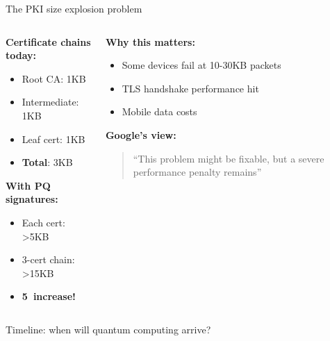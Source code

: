 \documentclass[aspectratio=169, lualatex, handout]{beamer}
\begin{document}
\begin{frame}{The PKI size explosion problem}
	\begin{columns}[c]
		\begin{column}{0.5\textwidth}
			\textbf{Certificate chains today:}
			\begin{itemize}
				\item Root CA: \approx1KB
				\item Intermediate: \approx1KB
				\item Leaf cert: \approx1KB
				\item \textbf{Total}: \approx3KB
			\end{itemize}
			\vspace{5mm}
			\textbf{With PQ signatures:}
			\begin{itemize}
				\item Each cert: >5KB
				\item 3-cert chain: >15KB
				\item \textbf{5\times\ increase!}
			\end{itemize}
		\end{column}
		\begin{column}{0.5\textwidth}
			\textbf{Why this matters:}
			\begin{itemize}
				\item Some devices fail at 10-30KB packets
				\item TLS handshake performance hit
				\item Mobile data costs
			\end{itemize}
			\vspace{5mm}
			\textbf{Google's view:}
			\begin{quote}
				``This problem might be fixable, but a severe performance penalty remains''
			\end{quote}
		\end{column}
	\end{columns}
\end{frame}

\begin{frame}{Timeline: when will quantum computing arrive?}
\end{frame}
\end{document}
